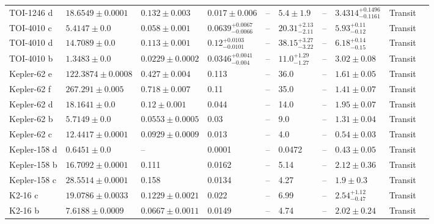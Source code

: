 \begin{tabular}{llllllllll}
TOI-1246 d & $18.6549 \pm 0.0001$ & $0.132 \pm 0.003$ & $0.017 \pm 0.006$ & -- & $5.4 \pm 1.9$ & -- & $3.4314^{+0.1496}_{-0.1161}$ & Transit & \cite{POLANSKI_ET_AL__2024} \\
TOI-4010 c & $5.4147 \pm 0.0$ & $0.058 \pm 0.001$ & $0.0639^{+0.0067}_{-0.0066}$ & -- & $20.31^{+2.13}_{-2.11}$ & -- & $5.93^{+0.11}_{-0.12}$ & Transit & \cite{KUNIMOTO_ET_AL__2023} \\
TOI-4010 d & $14.7089 \pm 0.0$ & $0.113 \pm 0.001$ & $0.12^{+0.0103}_{-0.0101}$ & -- & $38.15^{+3.27}_{-3.22}$ & -- & $6.18^{+0.14}_{-0.15}$ & Transit & \cite{KUNIMOTO_ET_AL__2023} \\
TOI-4010 b & $1.3483 \pm 0.0$ & $0.0229 \pm 0.0002$ & $0.0346^{+0.0041}_{-0.004}$ & -- & $11.0^{+1.29}_{-1.27}$ & -- & $3.02 \pm 0.08$ & Transit & \cite{KUNIMOTO_ET_AL__2023} \\
Kepler-62 e & $122.3874 \pm 0.0008$ & $0.427 \pm 0.004$ & 0.113 & -- & 36.0 & -- & $1.61 \pm 0.05$ & Transit & \cite{BORUCKI_ET_AL__2013} \\
Kepler-62 f & $267.291 \pm 0.005$ & $0.718 \pm 0.007$ & 0.11 & -- & 35.0 & -- & $1.41 \pm 0.07$ & Transit & \cite{BORUCKI_ET_AL__2013} \\
Kepler-62 d & $18.1641 \pm 0.0$ & $0.12 \pm 0.001$ & 0.044 & -- & 14.0 & -- & $1.95 \pm 0.07$ & Transit & \cite{BORUCKI_ET_AL__2013} \\
Kepler-62 b & $5.7149 \pm 0.0$ & $0.0553 \pm 0.0005$ & 0.03 & -- & 9.0 & -- & $1.31 \pm 0.04$ & Transit & \cite{BORUCKI_ET_AL__2013} \\
Kepler-62 c & $12.4417 \pm 0.0001$ & $0.0929 \pm 0.0009$ & 0.013 & -- & 4.0 & -- & $0.54 \pm 0.03$ & Transit & \cite{BORUCKI_ET_AL__2013} \\
Kepler-158 d & $0.6451 \pm 0.0$ & -- & 0.0001 & -- & 0.0472 & -- & $0.43 \pm 0.05$ & Transit & \cite{WANG_ET_AL_2024} \\
Kepler-158 b & $16.7092 \pm 0.0001$ & 0.111 & 0.0162 & -- & 5.14 & -- & $2.12 \pm 0.36$ & Transit & \cite{ROWE_ET_AL__2014} \\
Kepler-158 c & $28.5514 \pm 0.0001$ & 0.158 & 0.0134 & -- & 4.27 & -- & $1.9 \pm 0.3$ & Transit & \cite{ROWE_ET_AL__2014} \\
K2-16 c & $19.0786 \pm 0.0033$ & $0.1229 \pm 0.0021$ & 0.022 & -- & 6.99 & -- & $2.54^{+1.12}_{-0.47}$ & Transit & \cite{SINUKOFF_ET_AL__2016} \\
K2-16 b & $7.6188 \pm 0.0009$ & $0.0667 \pm 0.0011$ & 0.0149 & -- & 4.74 & -- & $2.02 \pm 0.24$ & Transit & \cite{SINUKOFF_ET_AL__2016} \\

\end{tabular}
